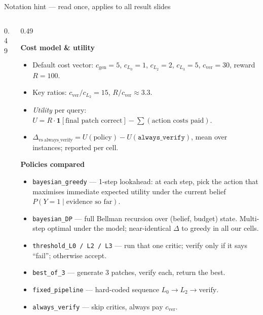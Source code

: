 \documentclass[10pt]{beamer}
\newcommand{\info}[1]{\textcolor{primaryBlue}{\textbf{#1}}}
\begin{document}
\begin{frame}{Notation hint --- read once, applies to all result slides}
\begin{columns}[T,onlytextwidth]
\begin{column}{0.49\textwidth}
\end{column}

\begin{column}{0.49\textwidth}

\info{Cost model \& utility}
\begin{itemize}\setlength{\itemsep}{1pt}
\item Default cost vector: $c_\mathrm{gen}{=}5$, $c_{L_0}{=}1$,
$c_{L_2}{=}2$, $c_{L_3}{=}5$, $c_\mathrm{ver}{=}30$, reward $R{=}100$.
\item Key ratios: $c_\mathrm{ver}/c_{L_2}{=}15$,
$R/c_\mathrm{ver}{\approx}3.3$.
\item \emph{Utility} per query:
$U = R\cdot \mathbf{1}[\text{final patch correct}] - \sum (\text{action
costs paid})$.
\item $\Delta_{\mathrm{vs\ always\_verify}} = U(\text{policy}) -
U(\texttt{always\_verify})$, mean over instances; reported per cell.
\end{itemize}

\vspace{6pt}
\info{Policies compared}
\begin{itemize}\setlength{\itemsep}{1.5pt}
\item \texttt{bayesian\_greedy} --- 1-step lookahead: at each step, pick
the action that maximises immediate expected utility under the current
belief $P(Y{=}1\mid\text{evidence so far})$.
\item \texttt{bayesian\_DP} --- full Bellman recursion over (belief,
budget) state. Multi-step optimal under the model; near-identical
$\Delta$ to greedy in all our cells.
\item \texttt{threshold\_L0 / L2 / L3} --- run that one critic; verify
only if it says ``fail''; otherwise accept.
\item \texttt{best\_of\_3} --- generate 3 patches, verify each, return
the best.
\item \texttt{fixed\_pipeline} --- hard-coded sequence
$L_0 \to L_2 \to \mathrm{verify}$.
\item \texttt{always\_verify} --- skip critics, always pay
$c_\mathrm{ver}$.
\end{itemize}

\end{column}
\end{columns}
\end{frame}
\end{document}
